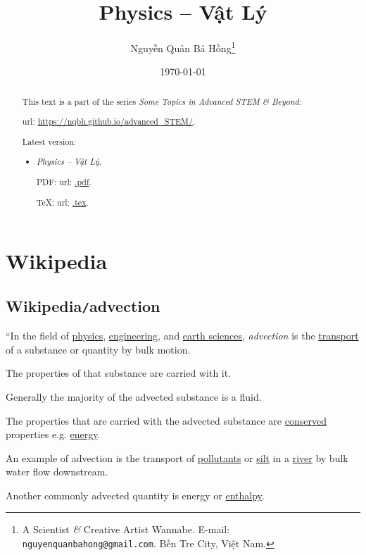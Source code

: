 \documentclass{article}
\title{Physics -- Vật Lý}
\author{Nguyễn Quản Bá Hồng\footnote{A Scientist {\it\&} Creative Artist Wannabe. E-mail: {\tt nguyenquanbahong@gmail.com}. Bến Tre City, Việt Nam.}}
\date{\today}
\begin{document}
\maketitle
\begin{abstract}
	This text is a part of the series {\it Some Topics in Advanced STEM \& Beyond}:
	
	{\sc url}: \url{https://nqbh.github.io/advanced_STEM/}.
	
	Latest version:
	\begin{itemize}
		\item {\it Physics -- Vật Lý}.
		
		PDF: {\sc url}: \url{.pdf}.
		
		\TeX: {\sc url}: \url{.tex}.
	\end{itemize}
\end{abstract}
\tableofcontents


\section{Wikipedia}

\subsection{Wikipedia{\tt/}advection}
``In the field of \href{https://en.wikipedia.org/wiki/Physics}{physics}, \href{https://en.wikipedia.org/wiki/Engineering}{engineering}, and \href{https://en.wikipedia.org/wiki/Earth_science}{earth sciences}, \textit{advection} is the \href{https://en.wikipedia.org/wiki/Transport}{transport} of a substance or quantity by bulk motion.

The properties of that substance are carried with it.

Generally the majority of the advected substance is a fluid.

The properties that are carried with the advected substance are \href{https://en.wikipedia.org/wiki/Conservation_of_energy}{conserved} properties e.g. \href{https://en.wikipedia.org/wiki/Energy}{energy}.

An example of advection is the transport of \href{https://en.wikipedia.org/wiki/Pollutant}{pollutants} or \href{https://en.wikipedia.org/wiki/Silt}{silt} in a \href{https://en.wikipedia.org/wiki/River}{river} by bulk water flow downstream.

Another commonly advected quantity is energy or \href{https://en.wikipedia.org/wiki/Enthalpy}{enthalpy}.
\end{document}
